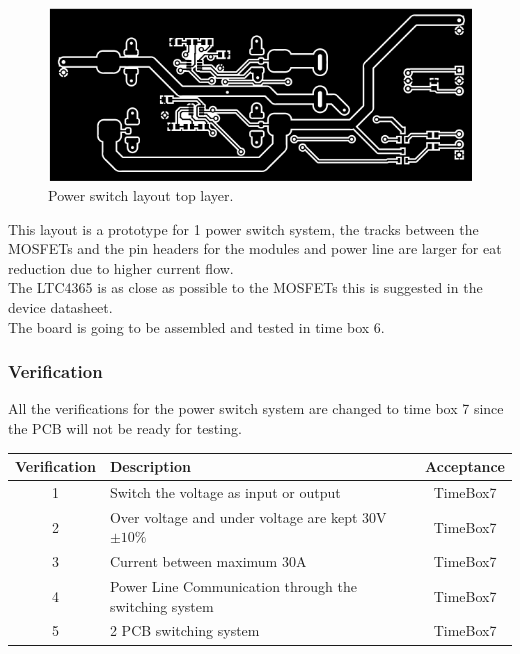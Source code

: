 \begin{figure}[H]
	\begin{centering}
		\includegraphics[width=1.0\textwidth]{images/tb5_layout_top.png}
		\caption{Power switch layout top layer.}
	\end{centering}
\end{figure}
%
This layout is a prototype for 1 power switch system, the tracks between the MOSFETs and the pin headers for the modules and power line are larger for eat reduction due to higher current flow.\\
The LTC4365 is as close as possible to the MOSFETs this is suggested in the device datasheet.\\
The board is going to be assembled and tested in time box 6.
%
\subsubsection{Verification}
All the verifications for the power switch system are changed to time box 7 since the PCB will not be ready for testing.
\begin{table}[H]
\centering
	\begin{tabular}{| c | l | c |}
		\hline
		Verification & Description & Acceptance \\\hline
		1 & Switch the voltage as input or output & TimeBox7 \\\hline
		2 & Over voltage and under voltage are kept 30V $ \pm10\% $ & TimeBox7 \\\hline
		3 & Current between maximum 30A & TimeBox7 \\\hline
		4 & Power Line Communication through the switching system & TimeBox7 \\\hline
		5 & 2 PCB switching system & TimeBox7 \\\hline
	\end{tabular}
\end{table}
%
%
